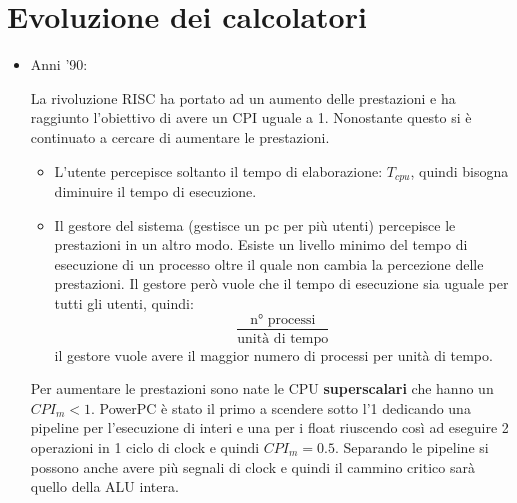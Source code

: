 \documentclass[a4paper]{article}
\theoremstyle{break}
\theoremstyle{break}
\theoremstyle{break}
\theoremstyle{break}
\begin{document}
\section{Evoluzione dei calcolatori}
\begin{itemize}
  \item Anni '90:

    \noindent La rivoluzione RISC ha portato ad un aumento delle prestazioni
    e ha raggiunto l'obiettivo di avere un CPI uguale a 1. Nonostante questo
    si è continuato a cercare di aumentare le prestazioni.
    \begin{itemize}
      \item L'utente percepisce soltanto il tempo di elaborazione: \( T_{cpu} \),
        quindi bisogna diminuire il tempo di esecuzione.

      \item Il gestore del sistema (gestisce un pc per più utenti) percepisce
        le prestazioni in un altro modo. Esiste un livello minimo del tempo
        di esecuzione di un processo oltre il quale non cambia la percezione
        delle prestazioni. Il gestore però vuole che il tempo di esecuzione
        sia uguale per tutti gli utenti, quindi:
        \[
         \frac{\text{n° processi}}{\text{unità di tempo}}
        \] 
        il gestore vuole avere il maggior numero di processi per unità di tempo.

    \end{itemize}
    \vspace{1em}
    \noindent Per aumentare le prestazioni sono nate le CPU \textbf{superscalari}
    che hanno un \( CPI_{m} < 1 \). PowerPC è stato il primo a scendere sotto
    l'1 dedicando una pipeline per l'esecuzione di interi e una per i float
    riuscendo così ad eseguire 2 operazioni in 1 ciclo di clock e quindi
    \( CPI_{m} = 0.5 \). Separando le pipeline si possono anche avere più segnali
    di clock e quindi il cammino critico sarà quello della ALU intera.

    \begin{figure}[H]
      \centering
\end{figure}
\end{itemize}
\end{document}
